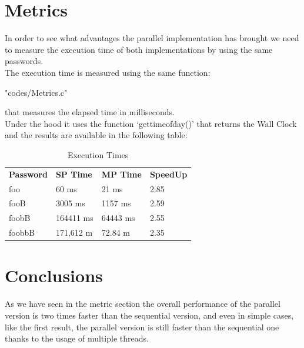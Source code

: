 \documentclass[10pt,twocolumn,letterpaper]{article}
\begin{document}
\section{Metrics}
In order to see what advantages the parallel implementation has brought we need to measure the execution time of both implementations by
using the same passwords.\\
The execution time is measured using the same function:\\
\begin{lstinputlisting}[language=C,style=CSnippetStyle,caption=Time Function,firstline=1,lastline=13]
		{"codes/Metrics.c"}
\end{lstinputlisting}
that measures the elapsed time in milliseconds.\\
Under the hood it uses the function `gettimeofday()' that returns the Wall Clock and the results are available in the following table:
\\
\begin{table}[H]
 \begin{tabularx}{\columnwidth}{X|X|X|X|}
\textbf{Password} & \textbf{SP Time} & \textbf{MP Time} &  \textbf{SpeedUp} \\
foo & 60 ms & 21 ms & 2.85 \\
fooB & 3005 ms & 1157 ms & 2.59 \\
foobB & 164411 ms & 64443 ms & 2.55 \\
foobbB & 171,612 m & 72.84 m & 2.35 \\

   \end{tabularx}
\caption{Execution Times}
\section{Conclusions}
As we have seen in the metric section the overall performance of the parallel version is two times faster than the sequential version,
and even in simple cases, like the first result, the parallel version is still faster than the sequential one thanks to the usage of 
multiple threads.\\
\end{table}
\end{document}
